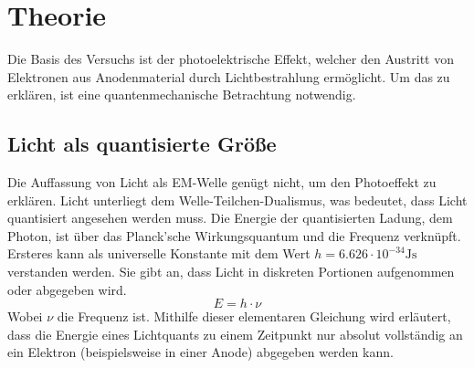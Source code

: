 \section{Theorie}
\label{sec:Theorie}

Die Basis des Versuchs ist der photoelektrische Effekt, welcher den Austritt 
von Elektronen aus Anodenmaterial durch Lichtbestrahlung ermöglicht. Um das 
zu erklären, ist eine quantenmechanische Betrachtung notwendig.

\subsection{Licht als quantisierte Größe}
Die Auffassung von Licht als EM-Welle genügt nicht, um den Photoeffekt zu
erklären. Licht unterliegt dem Welle-Teilchen-Dualismus, was bedeutet, dass 
Licht quantisiert angesehen werden muss. Die Energie der quantisierten Ladung, 
dem Photon, ist über das Planck'sche Wirkungsquantum und die Frequenz verknüpft. 
Ersteres kann als universelle Konstante mit dem Wert $h = 6.626 \cdot 10^{-34} \unit{\joule\second}$
verstanden werden. Sie gibt an, dass Licht in diskreten Portionen aufgenommen 
oder abgegeben wird.
\begin{equation}
    \label{eqn:1}
    E = h \cdot \nu
\end{equation}
Wobei $\nu$ die Frequenz ist. Mithilfe dieser elementaren Gleichung wird erläutert,
dass die Energie eines Lichtquants zu einem Zeitpunkt nur absolut vollständig
an ein Elektron (beispielsweise in einer Anode) abgegeben werden kann.

